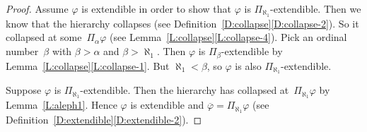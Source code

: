 \begin{proof}
Assume $\varphi$ is extendible
in order to show that $\varphi$ is $\Pi_{\aleph_1}$-extendible.
Then we know that the hierarchy collapses 
(see Definition~\ref{D:collapse}\ref{D:collapse-2}).
So it collapsed at some~$\Pi_\alpha \varphi$
(see Lemma~\ref{L:collapse}\ref{L:collapse-4}).
Pick an ordinal number~$\beta$ with $\beta > \alpha$
and $\beta > \aleph_1$.
Then $\varphi$ is $\Pi_\beta$-extendible
by Lemma~\ref{L:collapse}\ref{L:collapse-1}.
But $\aleph_1 <\beta$,
so $\varphi$ is also $\Pi_{\aleph_1}$-extendible.

Suppose $\varphi$ is $\Pi_{\aleph_1}$-extendible.
Then the hierarchy has collapsed at~$\Pi_{\aleph_1}\varphi$
by Lemma~\ref{L:aleph1}.
Hence 
$\varphi$ is extendible
and  $\overline\varphi = \Pi_{\aleph_1}\varphi$
(see Definition~\ref{D:extendible}\ref{D:extendible-2}).
\end{proof}

